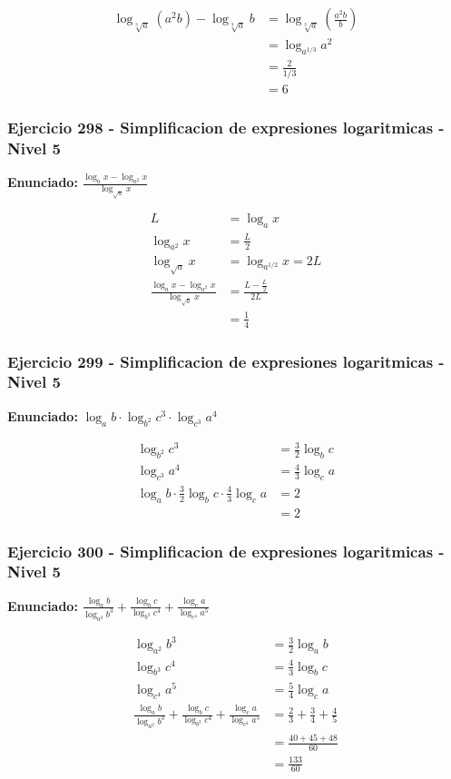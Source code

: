 \documentclass[12pt,a4paper]{article}
\begin{document}
\[
\begin{aligned}
\log_{\sqrt[3]{a}}(a^2b)-\log_{\sqrt[3]{a}}b&=\log_{\sqrt[3]{a}}\left(\frac{a^2b}{b}\right)\\
&=\log_{a^{1/3}}a^2\\
&=\frac{2}{1/3}\\
&=\boxed{6}
\end{aligned}
\]


\subsubsection*{Ejercicio 298 - Simplificacion de expresiones logaritmicas - Nivel 5}
\textbf{Enunciado:} \(\frac{\log_a x-\log_{a^2}x}{\log_{\sqrt a}x}\)

\[
\begin{aligned}
L&=\log_a x\\
\log_{a^2}x&=\frac L2\\
\log_{\sqrt a}x&=\log_{a^{1/2}}x=2L\\
\frac{\log_a x-\log_{a^2}x}{\log_{\sqrt a}x}&=\frac{L-\frac L2}{2L}\\
&=\boxed{\frac14}
\end{aligned}
\]


\subsubsection*{Ejercicio 299 - Simplificacion de expresiones logaritmicas - Nivel 5}
\textbf{Enunciado:} \(\log_a b\cdot\log_{b^2}c^3\cdot\log_{c^3}a^4\)

\[
\begin{aligned}
\log_{b^2}c^3&=\frac32\log_b c\\
\log_{c^3}a^4&=\frac43\log_c a\\
\log_a b\cdot\frac32\log_b c\cdot\frac43\log_c a&=2\\
&=\boxed{2}
\end{aligned}
\]


\subsubsection*{Ejercicio 300 - Simplificacion de expresiones logaritmicas - Nivel 5}
\textbf{Enunciado:} \(\frac{\log_a b}{\log_{a^2}b^3}+\frac{\log_b c}{\log_{b^3}c^4}+\frac{\log_c a}{\log_{c^4}a^5}\)

\[
\begin{aligned}
\log_{a^2}b^3&=\frac32\log_a b\\
\log_{b^3}c^4&=\frac43\log_b c\\
\log_{c^4}a^5&=\frac54\log_c a\\
\frac{\log_a b}{\log_{a^2}b^3}+\frac{\log_b c}{\log_{b^3}c^4}+\frac{\log_c a}{\log_{c^4}a^5}&=\frac23+\frac34+\frac45\\
&=\frac{40+45+48}{60}\\
&=\boxed{\frac{133}{60}}
\end{aligned}
\]
\end{document}
